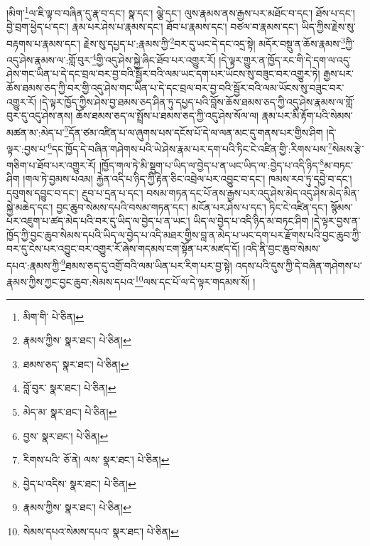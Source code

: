 །མིག་\footnote{མིག་གི་  པེ་ཅིན། }ལ་ཇི་ལྟ་བ་བཞིན་དུ་རྣ་བ་དང་། སྣ་དང་། ལྕེ་དང་། ལུས་རྣམས་ནས་རྒྱས་པར་མཐོང་བ་དང་། ཐོས་པ་དང་། བྱེ་བྲག་ཕྱེད་པ་དང་། རྣམ་པར་ཤེས་པ་རྣམས་དང་། ཐོབ་པ་རྣམས་དང་། བཙལ་བ་རྣམས་དང་། ཡིད་ཀྱིས་རྗེས་སུ་བརྟགས་པ་རྣམས་དང་། རྗེས་སུ་དཔྱད་པ་:རྣམས་ཀྱི་\footnote{རྣམས་ཀྱིས་  སྣར་ཐང་།  པེ་ཅིན། }བར་དུ་ཡང་དེ་དང་འདྲ་སྟེ། མདོར་བསྡུ་ན་ཆོས་རྣམས་\footnote{ཐམས་ཅད་  སྣར་ཐང་།  པེ་ཅིན། }ཀྱི་འདུ་ཤེས་རྣམས་ལ་:གློ་བུར་\footnote{བློ་བུར་  སྣར་ཐང་།  པེ་ཅིན། }གྱི་འདུ་ཤེས་སྐྱེ་ཞིང་ཐོབ་པར་འགྱུར་རོ། །དེ་ལྟར་གྱུར་ན་ཁྱོད་རང་གི་དེ་དག་ལ་འདུ་ཤེས་གང་ཡིན་པ་དེ་དང་བྲལ་བར་བྱ་བའི་སྦྱོར་བའི་ལམ་ཡང་དག་པར་ཡོངས་སུ་བཟུང་བར་འགྱུར་ཏེ། རྒྱས་པར་ཆོས་ཐམས་ཅད་ཀྱི་བར་གྱི་འདུ་ཤེས་གང་ཡིན་པ་དེ་དང་བྲལ་བར་བྱ་བའི་སྦྱོར་བའི་ལམ་ཡོངས་སུ་བཟུང་བར་འགྱུར་རོ། །དེ་ལྟར་ཁྱོད་ཀྱིས་ཤེས་བྱ་ཐམས་ཅད་ཤིན་ཏུ་དཔྱད་པའི་བློས་ཆོས་ཐམས་ཅད་ཀྱི་འདུ་ཤེས་རྣམས་ལ་གློ་བུར་དུ་འདུ་ཤེས་ནས། ཆོས་ཐམས་ཅད་ལ་སྤྲོས་པ་ཐམས་ཅད་ཀྱི་འདུ་ཤེས་སོལ་ལ། རྣམ་པར་མི་རྟོག་པའི་སེམས་མཚན་མ་:མེད་པ་\footnote{མེད་མ་  སྣར་ཐང་།  པེ་ཅིན། }དོན་ཙམ་འཛིན་པ་ལ་ཞུགས་པས་དངོས་པོ་དེ་ལ་ལན་མང་དུ་གནས་པར་གྱིས་ཤིག །དེ་ལྟར་:བྱས་པ་\footnote{བྱས་  སྣར་ཐང་།  པེ་ཅིན། }དང་ཁྱོད་དེ་བཞིན་གཤེགས་པའི་ཡེ་ཤེས་རྣམ་པར་དག་པའི་ཏིང་ངེ་འཛིན་གྱི་:རིགས་པས་\footnote{རིགས་པའི་  ཅོ་ནེ། ལས་  སྣར་ཐང་།  པེ་ཅིན། }སེམས་རྩེ་གཅིག་པ་ཐོབ་པར་འགྱུར་རོ། །ཁྱོད་གལ་ཏེ་མི་སྡུག་པ་ཡིད་ལ་བྱེད་པ་ན་ཡང་ཡིད་ལ་:བྱེད་པ་འདི་ཉིད་\footnote{བྱེད་པ་འདིས་  སྣར་ཐང་།  པེ་ཅིན། }མ་བཏང་ཤིག །གལ་ཏེ་བྱམས་པའམ། རྐྱེན་འདི་པ་ཉིད་ཀྱི་རྟེན་ཅིང་འབྲེལ་པར་འབྱུང་བ་དང་། ཁམས་རབ་ཏུ་དབྱེ་བ་དང་། དབུགས་དབྱུང་བ་དང་། རྔུབ་པ་དྲན་པ་དང་། བསམ་གཏན་དང་པོ་ནས་རྒྱས་པར་འདུ་ཤེས་མེད་འདུ་ཤེས་མེད་མིན་སྐྱེ་མཆེད་དང་། བྱང་ཆུབ་སེམས་དཔའི་བསམ་གཏན་དང་། མངོན་པར་ཤེས་པ་དང་། ཏིང་ངེ་འཛིན་དང་། སྙོམས་པར་འཇུག་པ་ཚད་མེད་པའི་བར་དུ་ཡིད་ལ་བྱེད་པ་ན་ཡང་། ཡིད་ལ་བྱེད་པ་འདི་ཉིད་མ་བཏང་ཤིག །དེ་ལྟར་བྱས་ན་ཁྱོད་ཀྱི་བྱང་ཆུབ་སེམས་དཔའི་ཡིད་ལ་བྱེད་པ་འདི་མཐར་གྱིས་བླ་ན་མེད་པ་ཡང་དག་པར་རྫོགས་པའི་བྱང་ཆུབ་ཀྱི་བར་དུ་ངེས་པར་འབྱུང་བར་འགྱུར་རོ་ཞེས་གདམས་ངག་སྟོན་པར་མཛད་དོ། །འདི་ནི་བྱང་ཆུབ་སེམས་དཔའ་:རྣམས་ཀྱི་\footnote{རྣམས་ཀྱིས་  སྣར་ཐང་།  པེ་ཅིན། }ཐམས་ཅད་དུ་འགྲོ་བའི་ལམ་ཡིན་པར་རིག་པར་བྱ་སྟེ། འདས་པའི་དུས་ཀྱི་དེ་བཞིན་གཤེགས་པ་རྣམས་ཀྱིས་ཀྱང་བྱང་ཆུབ་:སེམས་དཔའ་\footnote{སེམས་དཔའ་སེམས་དཔའ་  སྣར་ཐང་།  པེ་ཅིན། }ལས་དང་པོ་ལ་དེ་ལྟར་གདམས་སོ། །
